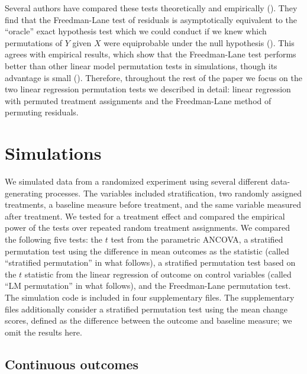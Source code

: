 \documentclass[12pt]{article}
\begin{document}
Several authors have compared these tests theoretically and empirically (\cite{anderson_empirical_1999, anderson_permutation_2001, kennedy_randomization_1996}).
They find that the Freedman-Lane test of residuals is asymptotically equivalent to the ``oracle'' exact hypothesis test which we could conduct if we knew which permutations of $Y$ given $X$ were equiprobable under the null hypothesis (\cite{anderson_permutation_2001}).
This agrees with empirical results, which show that the Freedman-Lane test performs better than other linear model permutation tests in simulations, though its advantage is small (\cite{anderson_empirical_1999}). 
Therefore, throughout the rest of the paper we focus on the two linear regression permutation tests we described in detail: linear regression with permuted treatment assignments and the Freedman-Lane method of permuting residuals.


\section{Simulations}\label{sec:simulations}

We simulated data from a randomized experiment using several different data-generating processes.
The variables included stratification, two randomly assigned treatments, a baseline measure before treatment, and the same variable measured after treatment.
We tested for a treatment effect and compared the empirical power of the tests over repeated random treatment assignments.
We compared the following five tests:
the $t$ test from the parametric ANCOVA,
a stratified permutation test using the difference in mean outcomes as the statistic
 (called ``stratified permutation'' in what follows),
a stratified permutation test based on the $t$ statistic from the linear regression of outcome on control variables (called ``LM permutation'' in what follows),
and the Freedman-Lane permutation test.
The simulation code is included in four supplementary files.
The supplementary files additionally consider a stratified permutation test using the mean change scores, defined as the difference between the outcome and baseline measure;
we omit the results here.


\subsection{Continuous outcomes}
\end{document}
